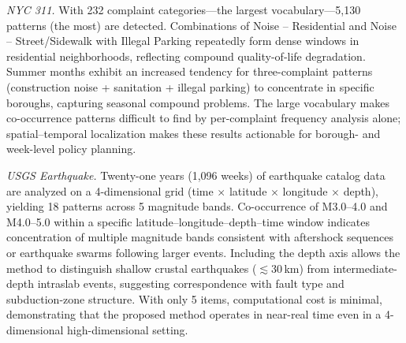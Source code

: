 \emph{NYC 311.}
With 232 complaint categories---the largest vocabulary---5,130 patterns (the most)
are detected.
Combinations of Noise -- Residential and Noise -- Street/Sidewalk with
Illegal Parking repeatedly form dense windows in residential neighborhoods,
reflecting compound quality-of-life degradation.
Summer months exhibit an increased tendency for three-complaint patterns
(construction noise + sanitation + illegal parking) to concentrate in specific boroughs,
capturing seasonal compound problems.
The large vocabulary makes co-occurrence patterns difficult to find
by per-complaint frequency analysis alone; spatial--temporal localization
makes these results actionable for borough- and week-level policy planning.

\emph{USGS Earthquake.}
Twenty-one years (1,096 weeks) of earthquake catalog data
are analyzed on a 4-dimensional grid
(time $\times$ latitude $\times$ longitude $\times$ depth),
yielding 18 patterns across 5 magnitude bands.
Co-occurrence of M3.0--4.0 and M4.0--5.0 within a specific
latitude--longitude--depth--time window
indicates concentration of multiple magnitude bands
consistent with aftershock sequences or earthquake swarms following larger events.
Including the depth axis allows the method to distinguish
shallow crustal earthquakes ($\lesssim$30\,km) from intermediate-depth
intraslab events, suggesting correspondence with fault type and
subduction-zone structure.
With only 5 items, computational cost is minimal,
demonstrating that the proposed method operates in near-real time
even in a 4-dimensional high-dimensional setting.
